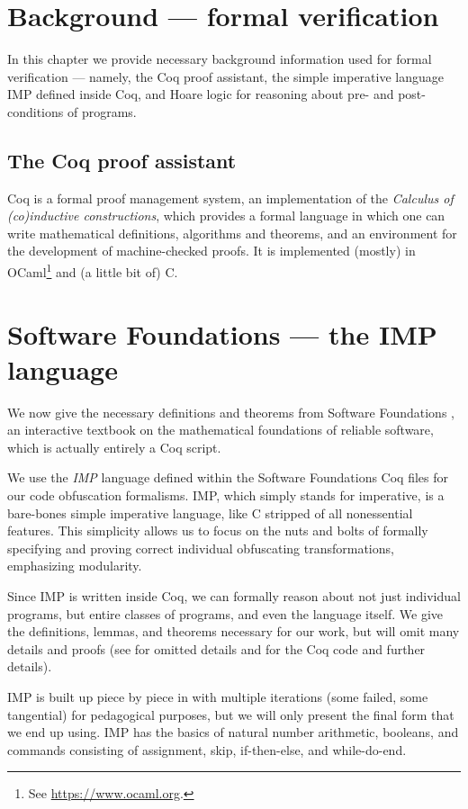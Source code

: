 \documentclass[compsoc,conference,a4paper,10pt,times]{IEEEtran}
\begin{document}
\section{Background --- formal verification}\label{two}
In this chapter we provide necessary background information used for formal verification --- namely, the Coq proof assistant, the simple imperative language IMP defined inside Coq, and Hoare logic for reasoning about pre- and post-conditions of programs.
\subsection{The Coq proof assistant}

Coq \cite{Coq} is a formal proof management system, an implementation of the \emph{Calculus of (co)inductive constructions}, which provides a formal language in which one can write mathematical definitions, algorithms and theorems, and an environment for the development of machine-checked proofs.  It is implemented (mostly) in OCaml\footnote{See \href{https://www.ocaml.org}{https://www.ocaml.org}.} and (a little bit of) C.

\section{Software Foundations --- the IMP language}
We now give the necessary definitions and theorems from Software Foundations \cite{SFV2}, an interactive textbook on the mathematical foundations of reliable software, which is actually entirely a Coq script.

\par We use the \emph{IMP} language defined within the Software Foundations Coq files for our code obfuscation formalisms.  IMP, which simply stands for imperative, is a bare-bones simple imperative language, like C stripped of all nonessential features.  This simplicity allows us to focus on the nuts and bolts of formally specifying and proving correct individual obfuscating transformations, emphasizing modularity.

\par Since IMP is written inside Coq, we can formally reason about not just individual programs, but entire classes of programs, and even the language itself.  We give the definitions, lemmas, and theorems necessary for our work, but will omit many details and proofs (see \cite{Weyun} for omitted details and \cite{WeiRepo} for the Coq code and further details).  

\par IMP is built up piece by piece in \cite{SFV2} with multiple iterations (some failed, some tangential) for pedagogical purposes, but we will only present the final form that we end up using.  IMP has the basics of natural number arithmetic, booleans, and commands consisting of assignment, skip, if-then-else, and while-do-end.
\end{document}
